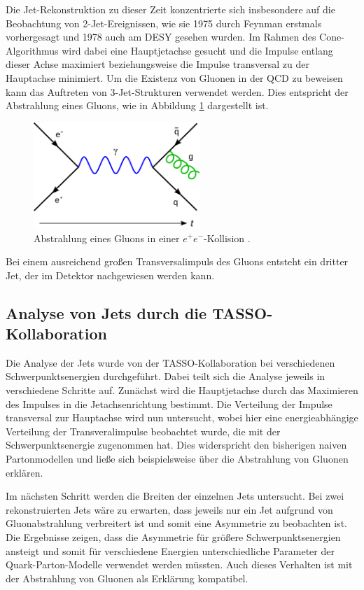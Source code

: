 Die Jet-Rekonstruktion zu dieser Zeit konzentrierte sich insbesondere auf die Beobachtung von 2-Jet-Ereignissen, wie sie 1975 durch Feynman erstmals vorhergesagt und 1978 auch am DESY gesehen wurden.
Im Rahmen des Cone-Algorithmus wird dabei eine Hauptjetachse gesucht und die Impulse entlang dieser Achse maximiert beziehungsweise die Impulse transversal zu der Hauptachse minimiert.
Um die Existenz von Gluonen in der QCD zu beweisen kann das Auftreten von 3-Jet-Strukturen verwendet werden.
Dies entspricht der Abstrahlung eines Gluons, wie in Abbildung \ref{fig:gluon} dargestellt ist.
\begin{figure}
  \centering
  \includegraphics[height=4.0cm]{ressources/gluon.png}
  \caption{Abstrahlung eines Gluons in einer $e^+ e^-$-Kollision \cite{gluon}.}
  \label{fig:gluon}
\end{figure}
Bei einem ausreichend großen Transversalimpuls des Gluons entsteht ein dritter Jet, der im Detektor nachgewiesen werden kann.

\subsection{Analyse von Jets durch die TASSO-Kollaboration}
Die Analyse der Jets wurde von der TASSO-Kollaboration bei verschiedenen Schwerpunktsenergien durchgeführt. 
Dabei teilt sich die Analyse jeweils in verschiedene Schritte auf.
Zunächst wird die Hauptjetachse durch das Maximieren des Impulses in die Jetachsenrichtung bestimmt.
Die Verteilung der Impulse transversal zur Hauptachse wird nun untersucht, wobei hier eine energieabhängige Verteilung der Transveralimpulse beobachtet wurde, die mit der Schwerpunktsenergie zugenommen hat. 
Dies widerspricht den bisherigen naiven Partonmodellen und ließe sich beispielsweise über die Abstrahlung von Gluonen erklären.

Im nächsten Schritt werden die Breiten der einzelnen Jets untersucht.
Bei zwei rekonstruierten Jets wäre zu erwarten, dass jeweils nur ein Jet aufgrund von Gluonabstrahlung verbreitert ist und somit eine Asymmetrie zu beobachten ist.
Die Ergebnisse zeigen, dass die Asymmetrie für größere Schwerpunktsenergien ansteigt und somit für verschiedene Energien unterschiedliche Parameter der Quark-Parton-Modelle verwendet werden müssten.
Auch dieses Verhalten ist mit der Abstrahlung von Gluonen als Erklärung kompatibel.

